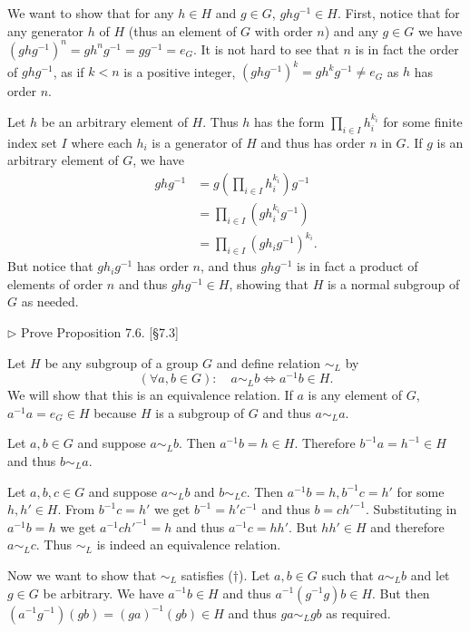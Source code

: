 \begin{solution}
	We want to show that for any $h \in H$ and $g \in G$, $ghg^{-1} \in H$. First, notice that for any generator $h$ of $H$ (thus an element of $G$ with order $n$) and any $g \in G$ we have $(ghg^{-1})^n = gh^ng^{-1} = gg^{-1} = e_G$. It is not hard to see that $n$ is in fact the order of $ghg^{-1}$, as if $k < n$ is a positive integer, $(ghg^{-1})^k = gh^kg^{-1} \neq e_G$ as $h$ has order $n$.
	
	Let $h$ be an arbitrary element of $H$. Thus $h$ has the form $\prod_{i \in I} h_i^{k_i}$ for some finite index set $I$ where each $h_i$ is a generator of $H$ and thus has order $n$ in $G$. If $g$ is an arbitrary element of $G$, we have
	\begin{equation*}
		\begin{aligned}
			ghg^{-1} 
			&= g (\prod_{i \in I} h_i^{k_i}) g^{-1} \\
			&= \prod_{i \in I} (g h_i^{k_i} g^{-1}) \\
			&= \prod_{i \in I} (g h_i g^{-1})^{k_i} \text{.}
		\end{aligned}
	\end{equation*}
	But notice that $g h_i g^{-1}$ has order $n$, and thus $ghg^{-1}$ is in fact a product of elements of order $n$ and thus $ghg^{-1} \in H$, showing that $H$ is a normal subgroup of $G$ as needed.
\end{solution}

\begin{problem}
	$\triangleright$ Prove Proposition 7.6. [\S 7.3]
\end{problem}

\begin{solution}
	Let $H$ be any subgroup of a group $G$ and define relation $\sim_L$ by
	\[
		(\forall a, b \in G):\quad a \sim_L b \Longleftrightarrow a^{-1}b \in H \text{.}
	\]
	We will show that this is an equivalence relation. If $a$ is any element of $G$, $a^{-1}a = e_G \in H$ because $H$ is a subgroup of $G$ and thus $a \sim_L a$. 
	
	Let $a, b \in G$ and suppose $a \sim_L b$. Then $a^{-1}b = h \in H$. Therefore $b^{-1}a = h^{-1} \in H$ and thus $b \sim_L a$.
	
	Let $a, b, c \in G$ and suppose $a \sim_L b$ and $b \sim_L c$. Then $a^{-1}b = h, b^{-1}c = h'$ for some $h, h' \in H$. From $b^{-1}c = h'$ we get $b^{-1} = h'c^{-1}$ and thus $b = c h'^{-1}$. Substituting in $a^{-1} b = h$ we get $a^{-1} c h'^{-1} = h$ and thus $a^{-1} c = h h'$. But $h h' \in H$ and therefore $a \sim_L c$. Thus $\sim_L$ is indeed an equivalence relation.
	
	Now we want to show that $\sim_L$ satisfies ($\dagger$). Let $a, b \in G$ such that $a \sim_L b$ and let $g \in G$ be arbitrary. We have $a^{-1} b \in H$ and thus $a^{-1} (g^{-1} g) b \in H$. But then $(a^{-1} g^{-1}) (g b) = (g a)^{-1} (g b) \in H$ and thus $ga \sim_L gb$ as required.
\end{solution}

